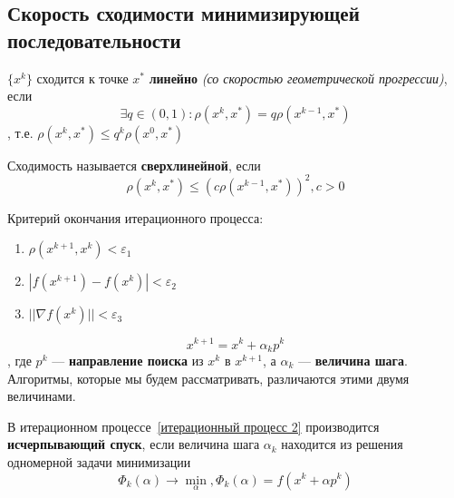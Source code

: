 \subsection{Скорость сходимости минимизирующей последовательности}

\begin{definition}
    \(\{x^k\} \) сходится к точке \(x^*\) \textbf{линейно} \textit{(со скоростью геометрической прогрессии)}, если
    \[\exists q \in (0, 1) : \rho(x^k, x^*) = q \rho(x^{k - 1}, x^*)\]
    , т.е. \(\rho(x^k, x^*) \leq q^k \rho(x^0, x^*)\)
\end{definition}

\begin{definition}
    Сходимость называется \textbf{сверхлинейной}, если
    \[\rho(x^k, x^*) \leq (c \rho(x^{k - 1}, x^*))^2, c > 0\]
\end{definition}

Критерий окончания итерационного процесса:
\begin{enumerate}
    \item \(\rho(x^{k + 1}, x^k) < \varepsilon_1\)
    \item \(|f(x^{k + 1}) - f(x^k)| < \varepsilon_2\)
    \item \(||\nabla f(x^k)|| < \varepsilon_3\)
\end{enumerate}

\begin{equation}
    x^{k + 1} = x^k + \alpha_k p^k
    \label{итерационный процесс 2}
\end{equation}
, где \(p^k\) --- \textbf{направление поиска} из \(x^k\) в \(x^{k + 1}\), а \(\alpha_k\) --- \textbf{величина шага}. Алгоритмы, которые мы будем рассматривать, различаются этими двумя величинами.

\begin{definition}
    В итерационном процессе~\eqref{итерационный процесс 2} производится \textbf{исчерпывающий спуск}, если величина шага \(\alpha_k\) находится из решения одномерной задачи минимизации
    \begin{equation}
        \Phi_k(\alpha) \to \min_\alpha, \Phi_k(\alpha) = f(x^k + \alpha p^k)
        \label{исчерпывающий спуск}
    \end{equation}
\end{definition}

